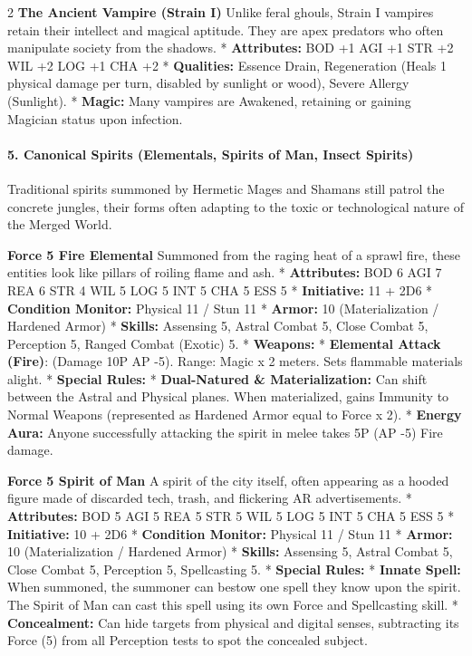 \documentclass[
  oneside]{article}
\begin{document}
\begin{multicols}{2}
\textbf{The Ancient Vampire (Strain I)} Unlike
feral ghouls, Strain I vampires retain their
intellect and magical aptitude. They are apex
predators who often manipulate society from the
shadows. * \textbf{Attributes:} BOD +1 \textbar{}
AGI +1 \textbar{} STR +2 \textbar{} WIL +2
\textbar{} LOG +1 \textbar{} CHA +2 *
\textbf{Qualities:} Essence Drain, Regeneration
(Heals 1 physical damage per turn, disabled by
sunlight or wood), Severe Allergy (Sunlight). *
\textbf{Magic:} Many vampires are Awakened,
retaining or gaining Magician status upon
infection.

\hypertarget{canonical-spirits-elementals-spirits-of-man-insect-spirits}{%
\paragraph{5. Canonical Spirits (Elementals,
Spirits of Man, Insect
Spirits)}\label{canonical-spirits-elementals-spirits-of-man-insect-spirits}}

Traditional spirits summoned by Hermetic Mages and
Shamans still patrol the concrete jungles, their
forms often adapting to the toxic or technological
nature of the Merged World.

\textbf{Force 5 Fire Elemental} Summoned from the
raging heat of a sprawl fire, these entities look
like pillars of roiling flame and ash. *
\textbf{Attributes:} BOD 6 \textbar{} AGI 7
\textbar{} REA 6 \textbar{} STR 4 \textbar{} WIL 5
\textbar{} LOG 5 \textbar{} INT 5 \textbar{} CHA 5
\textbar{} ESS 5 * \textbf{Initiative:} 11 + 2D6 *
\textbf{Condition Monitor:} Physical 11 / Stun 11
* \textbf{Armor:} 10 (Materialization / Hardened
Armor) * \textbf{Skills:} Assensing 5, Astral
Combat 5, Close Combat 5, Perception 5, Ranged
Combat (Exotic) 5. * \textbf{Weapons:} *
\textbf{Elemental Attack (Fire)}: (Damage 10P
\textbar{} AP -5). Range: Magic x 2 meters. Sets
flammable materials alight. * \textbf{Special
Rules:} * \textbf{Dual-Natured \&
Materialization:} Can shift between the Astral and
Physical planes. When materialized, gains Immunity
to Normal Weapons (represented as Hardened Armor
equal to Force x 2). * \textbf{Energy Aura:}
Anyone successfully attacking the spirit in melee
takes 5P (AP -5) Fire damage.

\textbf{Force 5 Spirit of Man} A spirit of the
city itself, often appearing as a hooded figure
made of discarded tech, trash, and flickering AR
advertisements. * \textbf{Attributes:} BOD 5
\textbar{} AGI 5 \textbar{} REA 5 \textbar{} STR 5
\textbar{} WIL 5 \textbar{} LOG 5 \textbar{} INT 5
\textbar{} CHA 5 \textbar{} ESS 5 *
\textbf{Initiative:} 10 + 2D6 * \textbf{Condition
Monitor:} Physical 11 / Stun 11 * \textbf{Armor:}
10 (Materialization / Hardened Armor) *
\textbf{Skills:} Assensing 5, Astral Combat 5,
Close Combat 5, Perception 5, Spellcasting 5. *
\textbf{Special Rules:} * \textbf{Innate Spell:}
When summoned, the summoner can bestow one spell
they know upon the spirit. The Spirit of Man can
cast this spell using its own Force and
Spellcasting skill. * \textbf{Concealment:} Can
hide targets from physical and digital senses,
subtracting its Force (5) from all Perception
tests to spot the concealed subject.


\end{multicols}
\end{document}
